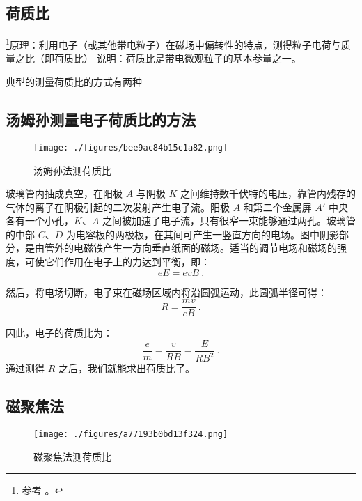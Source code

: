 

\subsection{荷质比}
\footnote{参考 \cite{新电}。}原理：利用电子（或其他带电粒子）在磁场中偏转性的特点，测得粒子电荷与质量之比（即荷质比）
说明：荷质比是带电微观粒子的基本参量之一。

典型的测量荷质比的方式有两种

\subsection{汤姆孙测量电子荷质比的方法}

\begin{figure}[ht]
\centering
\texttt{[image: ./figures/bee9ac84b15c1a82.png]}
\caption{汤姆孙法测荷质比} \label{fig_Charge_1}
\end{figure}

玻璃管内抽成真空，在阳极 $A$ 与阴极 $K$ 之间维持数千伏特的电压，靠管内残存的气体的离子在阴极引起的二次发射产生电子流。阳极 $A$ 和第二个金属屏 $A'$ 中央各有一个小孔，$K$、$A$ 之间被加速了电子流，只有很窄一束能够通过两孔。玻璃管的中部 $C$、$D$ 为电容板的两极板，在其间可产生一竖直方向的电场。图中阴影部分，是由管外的电磁铁产生一方向垂直纸面的磁场。适当的调节电场和磁场的强度，可使它们作用在电子上的力达到平衡，即：
\begin{equation}
eE=evB~.
\end{equation}

然后，将电场切断，电子束在磁场区域内将沿圆弧运动，此圆弧半径可得：
\begin{equation}
R=\frac {mv}{eB}~.
\end{equation}

因此，电子的荷质比为：
\begin{equation}
\frac{e}{m}=\frac{v}{RB}=\frac {E}{RB^2}~.
\end{equation}
通过测得 $R$ 之后，我们就能求出荷质比了。

\subsection{磁聚焦法}

\begin{figure}[ht]
\centering
\texttt{[image: ./figures/a77193b0bd13f324.png]}
\caption{磁聚焦法测荷质比} \label{fig_Charge_2}
\end{figure}

